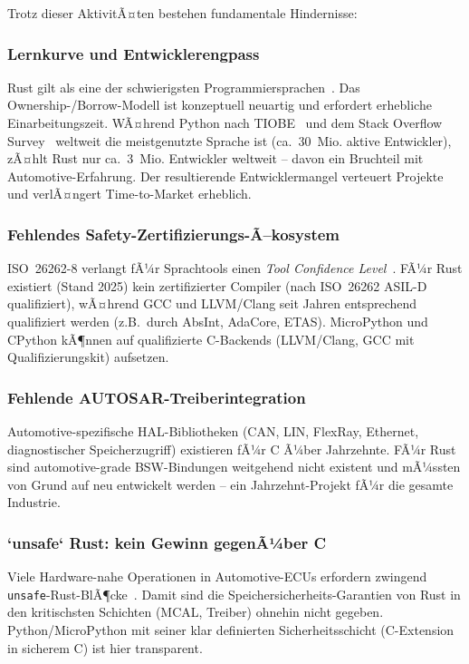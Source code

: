 ﻿\documentclass[12pt,a4paper,twoside]{article}
\begin{document}
Trotz dieser AktivitÃ¤ten bestehen fundamentale Hindernisse:

\subsubsection{Lernkurve und Entwicklerengpass}
Rust gilt als eine der schwierigsten Programmiersprachen~\cite{stackoverflow_survey2024}.
Das Ownership-/Borrow-Modell ist konzeptuell neuartig und erfordert
erhebliche Einarbeitungszeit.
WÃ¤hrend Python nach TIOBE~\cite{tiobe2025} und dem
Stack Overflow Survey~\cite{stackoverflow_survey2024} weltweit die
meistgenutzte Sprache ist (ca.\ 30~Mio. aktive Entwickler), zÃ¤hlt
Rust nur ca.\ 3~Mio. Entwickler weltweit -- davon ein Bruchteil
mit Automotive-Erfahrung. Der resultierende Entwicklermangel
verteuert Projekte und verlÃ¤ngert Time-to-Market erheblich.

\subsubsection{Fehlendes Safety-Zertifizierungs-Ã–kosystem}
ISO~26262-8 verlangt fÃ¼r Sprachtools einen
\emph{Tool Confidence Level}~\cite{iso26262_2018}.
FÃ¼r Rust existiert (Stand 2025) kein zertifizierter Compiler
(nach ISO~26262 ASIL-D qualifiziert), wÃ¤hrend GCC und LLVM/Clang
seit Jahren entsprechend qualifiziert werden (z.B.\ durch
AbsInt, AdaCore, ETAS).
MicroPython und CPython kÃ¶nnen auf qualifizierte C-Backends
(LLVM/Clang, GCC mit Qualifizierungskit) aufsetzen.

\subsubsection{Fehlende AUTOSAR-Treiberintegration}
Automotive-spezifische HAL-Bibliotheken (CAN, LIN, FlexRay, Ethernet,
diagnostischer Speicherzugriff) existieren fÃ¼r C Ã¼ber Jahrzehnte.
FÃ¼r Rust sind automotive-grade BSW-Bindungen weitgehend nicht existent
und mÃ¼ssten von Grund auf neu entwickelt werden -- ein
Jahrzehnt-Projekt fÃ¼r die gesamte Industrie.

\subsubsection{`unsafe` Rust: kein Gewinn gegenÃ¼ber C}
Viele Hardware-nahe Operationen in Automotive-ECUs erfordern
zwingend \texttt{unsafe}-Rust-BlÃ¶cke~\cite{rust_unsafe2021}.
Damit sind die Speichersicherheits-Garantien von Rust in den
kritischsten Schichten (MCAL, Treiber) ohnehin nicht gegeben.
Python/MicroPython mit seiner klar definierten Sicherheitsschicht
(C-Extension in sicherem C) ist hier transparent.
\end{document}
